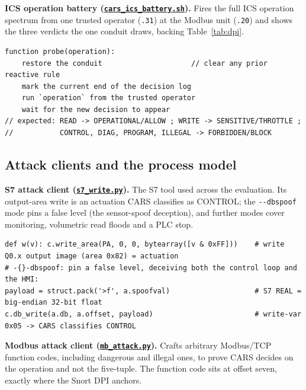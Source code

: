\noindent \textbf{ICS operation battery (\href{\repourl/blob/main/06_Build/cars_ics_battery.sh}{\texttt{cars\_ics\_battery.sh}}).} Fires the full ICS operation spectrum from one trusted operator (\texttt{.31}) at the Modbus unit (\texttt{.20}) and shows the three verdicts the one conduit draws, backing Table~\ref{tab:dpi}.

\begin{lstlisting}[style=carspseudo,caption={Fire each operation on the same conduit and await the new decision, in pseudocode.},label={lst:battery}]
function probe(operation):
    restore the conduit                     // clear any prior reactive rule
    mark the current end of the decision log
    run `operation` from the trusted operator
    wait for the new decision to appear
// expected: READ -> OPERATIONAL/ALLOW ; WRITE -> SENSITIVE/THROTTLE ;
//           CONTROL, DIAG, PROGRAM, ILLEGAL -> FORBIDDEN/BLOCK
\end{lstlisting}

\subsection*{Attack clients and the process model}

\noindent \textbf{S7 attack client (\href{\repourl/blob/main/06_Build/s7_write.py}{\texttt{s7\_write.py}}).} The S7 tool used across the evaluation. Its output-area write is an actuation CARS classifies as CONTROL; the \texttt{-{}-dbspoof} mode pins a false level (the sensor-spoof deception), and further modes cover monitoring, volumetric read floods and a PLC stop.

\begin{lstlisting}[style=carssrc,caption={The output-area write (actuation) and the sensor-spoof variant.},label={lst:s7write}]
def w(v): c.write_area(PA, 0, 0, bytearray([v & 0xFF]))    # write Q0.x output image (area 0x82) = actuation
# -{}-dbspoof: pin a false level, deceiving both the control loop and the HMI:
payload = struct.pack('>f', a.spoofval)                    # S7 REAL = big-endian 32-bit float
c.db_write(a.db, a.offset, payload)                        # write-var 0x05 -> CARS classifies CONTROL
\end{lstlisting}

\noindent \textbf{Modbus attack client (\href{\repourl/blob/main/06_Build/mb_attack.py}{\texttt{mb\_attack.py}}).} Crafts arbitrary Modbus/TCP function codes, including dangerous and illegal ones, to prove CARS decides on the operation and not the five-tuple. The function code sits at offset seven, exactly where the Snort DPI anchors.

